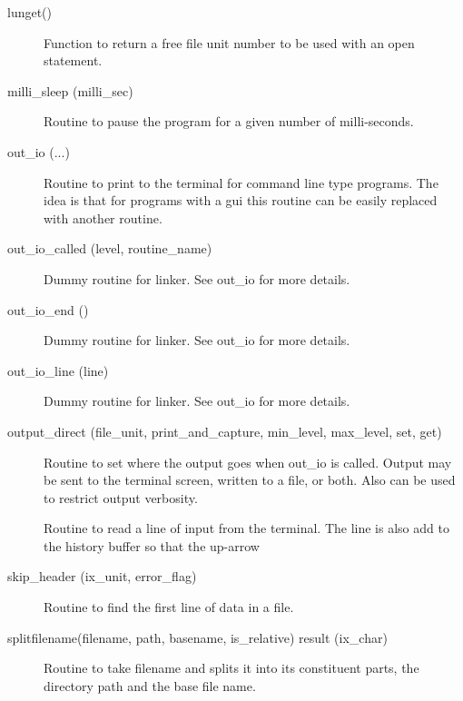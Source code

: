 \begin{description}
\label{r:lunget}
\item[lunget()] \Newline 
Function to return a free file unit number to be used with an open statement.

\label{r:milli.sleep}
\item[milli_sleep (milli_sec)] \Newline 
Routine to pause the program for a given number of milli-seconds.

\label{r:out.io}
\item[out_io (...)] \Newline 
Routine to print to the terminal for command line type programs.
The idea is that for programs with a gui this routine can be easily
replaced with another routine.

\label{r:out.io.called}
\item[out_io_called (level, routine_name)] \Newline 
Dummy routine for linker.
See out_io for more details.

\label{r:out.io.end}
\item[out_io_end ()] \Newline 
Dummy routine for linker.
See out_io for more details.

\label{r:out.io.line}
\item[out_io_line (line)] \Newline 
Dummy routine for linker.
See out_io for more details.

\label{r:output.direct}
\item[output_direct (file_unit, print_and_capture, min_level, max_level, set, get)] \Newline 
Routine to set where the output goes when out_io is called.
Output may be sent to the terminal screen, written to a file, or both.
Also can be used to restrict output verbosity.

\label{r:read.a.line}
\item[\protect\parbox{6in}{
    read_a_line (prompt, line_out, trim_prompt, prompt_color, prompt_bold, \\
    \hspace*{1in} history_file) }] \Newline 
Routine to read a line of input from the terminal.
The line is also add to the history buffer so that the up-arrow

\label{r:skip.header}
\item[skip_header (ix_unit, error_flag)] \Newline 
Routine to find the first line of data in a file. 

\label{r:splitfilename}
\item[splitfilename(filename, path, basename, is_relative) result (ix_char)] \Newline 
Routine to take filename and splits it into its constituent parts, 
the directory path and the base file name.  


\end{description}
